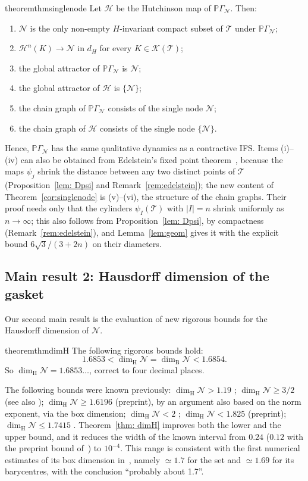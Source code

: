 \documentclass[11pt]{amsart}
\theoremstyle{definition}
\theoremstyle{remark}
\newcommand{\cN}{\mathcal N}
\newcommand{\cT}{\mathcal T}
\newcommand{\PGN}{{\mathbb P}\Gamma_{\mathcal N}}
\newcommand{\dimH}{\dim_{\mathrm H}}
\newcommand{\dimB}{\dim_{\mathrm B}}
\newcommand{\abs}[1]{\lvert #1\rvert}
\begin{document}
\begin{restatable}{theorem}{thmsinglenode}
\label{cor:singlenode}
    Let $\mathcal H$ be the Hutchinson map of $\PGN$.
    Then:
    \begin{enumerate}
    \item[(i)] $\cN$ is the only non-empty $H$-invariant compact subset of $\cT$ under $\PGN$;
    \item[(ii)] $\mathcal H^n(K)\to\cN$ in $d_H$ for every $K\in\mathcal K(\cT)$;
    \item[(iii)] the global attractor of $\PGN$ is $\cN$;
    \item[(iv)] the global attractor of $\mathcal H$ is $\{\cN\}$;
    \item[(v)] the chain graph of $\PGN$ consists of the single node $\cN$;
    \item[(vi)] the chain graph of $\mathcal H$ consists of the single node $\{\cN\}$.
\end{enumerate}
\end{restatable}

Hence, $\PGN$ has the same qualitative dynamics as a contractive IFS. Items (i)--(iv) can also be obtained from Edelstein's fixed point theorem~\cite{Ede62}, because the maps $\psi_j$ shrink the distance between any two distinct points of $\cT$ (Proposition~\ref{lem: Dpsi} and Remark~\ref{rem:edelstein}); the new content of Theorem~\ref{cor:singlenode} is (v)--(vi), the structure of the chain graphs. Their proof needs only that the cylinders $\psi_I(\cT)$ with $\abs I=n$ shrink uniformly as $n\to\infty$; this also follows from Proposition~\ref{lem: Dpsi}, by compactness (Remark~\ref{rem:edelstein}), and Lemma~\ref{lem:geom} gives it with the explicit bound $6\sqrt3/(3+2n)$ on their diameters.

\subsection*{Main result 2: Hausdorff dimension of the gasket}

Our second main result is the evaluation of new rigorous bounds for the Hausdorff dimension of $\cN$.

\begin{restatable}{theorem}{thmdimH}
    \label{thm: dimH}
     The following rigorous bounds hold:
     \[
     1.6853<\dimH\cN=\dimB\cN<1.6854.
     \]
     So $\dimH\cN=1.6853\ldots$, correct to four decimal places.
\end{restatable}

The following bounds were known previously: $\dimH\cN>1.19$ \cite{GRM20};
$\dimH\cN\ge3/2$ \cite{JLPX23} (see also \cite{LPX23}); $\dimH\cN\ge1.6196$ \cite{Sew23} (preprint), by an argument also based on the norm exponent, via the box dimension;
$\dimH\cN<2$ \cite{AHS16};
$\dimH\cN<1.825$ \cite{Fou20} (preprint);
$\dimH\cN\le1.7415$ \cite{PS23}.
Theorem~\ref{thm: dimH} improves both the lower and the upper bound, and it reduces the width of the known interval from $0.24$ ($0.12$ with the preprint bound of~\cite{Sew23}) to $10^{-4}$.
This range is consistent with the first numerical estimates of its box dimension in~\cite{DD07,DL08,DD09}, namely $\simeq1.7$ for the set and $\simeq1.69$ for its barycentres, with the conclusion ``probably about 1.7''.
\end{document}
